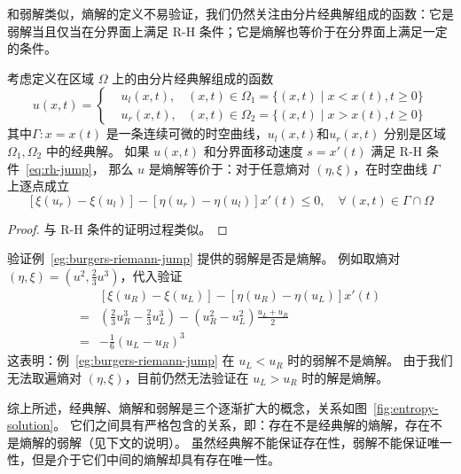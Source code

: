 和弱解类似，熵解的定义不易验证，我们仍然关注由分片经典解组成的函数：它是弱解当且仅当在分界面上满足 R-H 条件；它是熵解也等价于在分界面上满足一定的条件。

\begin{theorem}[分片熵解的刻画]
    考虑定义在区域 $\Omega$ 上的由分片经典解组成的函数
    \[
        u(x,t) =
        \left\{
        \begin{aligned}
             & u_l(x,t), & (x,t) \in \Omega_1 = \{(x,t) \mid x < x(t), t \ge 0\} \\
             & u_r(x,t), & (x,t) \in \Omega_2 = \{(x,t) \mid x > x(t), t \ge 0\}
        \end{aligned}
        \right.
    \]
    其中$\Gamma: x=x(t)$ 是一条连续可微的时空曲线，$u_l(x,t)$和$u_r(x,t)$ 分别是区域 $\Omega_1,\Omega_2$ 中的经典解。
    如果 $u(x,t)$ 和分界面移动速度 $s = x'(t)$ 满足 R-H 条件~\eqref{eq:rh-jump}，
    那么 $u$ 是熵解等价于：对于任意熵对 $(\eta,\xi)$，在时空曲线 $\Gamma$ 上逐点成立
    \begin{equation} \label{eq:entropy-jump}
        \left[\xi(u_r) - \xi(u_l)\right] - \left[\eta(u_r) - \eta(u_l)\right] x'(t) \le 0, \quad \forall\, (x,t) \in \Gamma \cap \Omega
    \end{equation}
\end{theorem}

\begin{proof}
    与 R-H 条件的证明过程类似。
\end{proof}

\begin{example}
    验证例~\ref{eg:burgers-riemann-jump} 提供的弱解是否是熵解。
    例如取熵对 $(\eta,\xi) = (u^2, \frac23 u^3)$，代入验证
    \begin{align*}
            & \left[\xi(u_R) - \xi(u_L)\right] - \left[\eta(u_R) - \eta(u_L)\right] x'(t)               \\
        ={} & \left(\frac23 u_R^3 - \frac23 u_L^3\right) - \left(u_R^2 - u_L^2\right) \frac{u_L + u_R}2 \\
        ={} & - \frac16 (u_L - u_R)^3
    \end{align*}
    这表明：例~\ref{eg:burgers-riemann-jump} 在 $u_L < u_R$ 时的弱解不是熵解。
    由于我们无法取遍熵对 $(\eta,\xi)$，目前仍然无法验证在 $u_L > u_R$ 时的解是熵解。
\end{example}

综上所述，经典解、熵解和弱解是三个逐渐扩大的概念，关系如图~\ref{fig:entropy-solution}。
它们之间具有严格包含的关系，即：存在不是经典解的熵解，存在不是熵解的弱解（见下文的说明）。
虽然经典解不能保证存在性，弱解不能保证唯一性，但是介于它们中间的熵解却具有存在唯一性。

